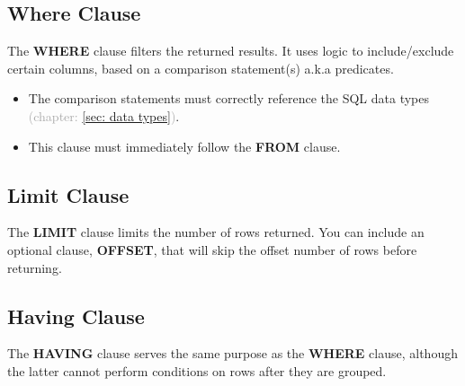 
\subsection{Where Clause}
The \textcolor{textgray}{\textbf{WHERE}} clause filters the returned results. It uses logic to include/exclude certain columns, based on a comparison statement(s) a.k.a predicates.
\begin{itemize}
    \item The comparison statements must correctly reference the SQL data types \textcolor{darkgray}{(chapter: \ref{sec: data types})}.
    \item This clause must immediately follow the \textcolor{textgray}{\textbf{FROM}} clause.
\end{itemize}

\subsection{Limit Clause}
The \textcolor{textgray}{\textbf{LIMIT}} clause limits the number of rows returned. You can include an optional clause, \textcolor{textgray}{\textbf{OFFSET}}, that will skip the offset number of rows before returning.

\subsection{Having Clause}
\label{sec: having clause}
The \textcolor{textgray}{\textbf{HAVING}} clause serves the same purpose as the \textcolor{textgray}{\textbf{WHERE}} clause, although the latter cannot perform conditions on rows after they are grouped.